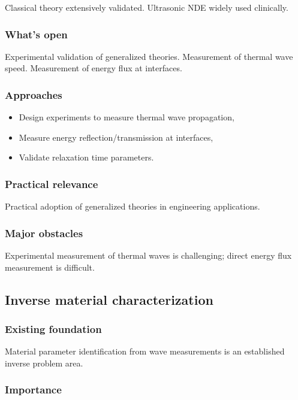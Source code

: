 Classical theory extensively validated. Ultrasonic NDE widely used clinically.

\subsubsection{What's open}

Experimental validation of generalized theories. Measurement of thermal wave speed. Measurement of energy flux at interfaces.

\subsubsection{Approaches}

\begin{itemize}
\item Design experiments to measure thermal wave propagation,
\item Measure energy reflection/transmission at interfaces,
\item Validate relaxation time parameters.
\end{itemize}

\subsubsection{Practical relevance}

Practical adoption of generalized theories in engineering applications.

\subsubsection{Major obstacles}

Experimental measurement of thermal waves is challenging; direct energy flux measurement is difficult.

\subsection{Inverse material characterization}
\label{sec:16.9}

\subsubsection{Existing foundation}

Material parameter identification from wave measurements is an established inverse problem area.

\subsubsection{Importance}

